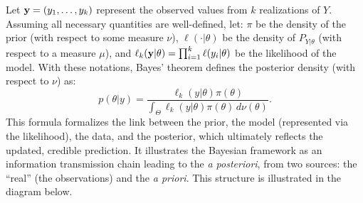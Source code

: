 Let $\mathbf{y} = (y_1, \ldots, y_k)$ represent the observed values from $k$ realizations of $Y$. Assuming all necessary quantities are well-defined, let:
$\pi$ be the density of the prior (with respect to some measure $\nu$), $\ell(\cdot|\theta)$ be the density of $P_{Y|\theta}$ (with respect to a measure $\mu$),
and $\ell_k(\mathbf{y}|\theta) = \prod_{i=1}^k \ell(y_i|\theta)$ be the likelihood of the model.
With these notations, Bayes’ theorem defines the posterior density (with respect to $\nu$) as:
\begin{equation}
    p(\theta|y) = \frac{\ell_k(y|\theta)\pi(\theta)}{\int_\Theta \ell_k(y|\theta)\pi(\theta) \, d\nu(\theta)}.
\end{equation}
This formula formalizes the link between the prior, the model (represented via the likelihood), the data, and the posterior, which ultimately reflects the updated, credible prediction. It illustrates the Bayesian framework as an information transmission chain leading to the \emph{a posteriori}, from  two sources: the ``real''  (the observations) and the \emph{a priori}. This structure is illustrated in the diagram below.
\begin{figure}[h]
    \centering
\end{figure}

